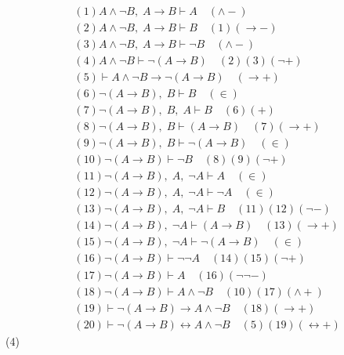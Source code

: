 \documentclass{article}
\begin{document}
\[
\begin{aligned}
&(1) A \wedge \neg B,\; A \to B \vdash A \quad (\wedge -) \\
&(2) A \wedge \neg B,\; A \to B \vdash B \quad (1)(\to -) \\
&(3) A \wedge \neg B,\; A \to B \vdash \neg B \quad (\wedge -) \\
&(4) A \wedge \neg B \vdash \neg (A \to B) \quad (2)(3)(\neg +) \\
&(5) \vdash A \wedge \neg B \to \neg (A \to B) \quad (\to +) \\
&(6) \neg (A \to B),\; B \vdash B \quad (\in) \\
&(7) \neg (A \to B),\; B, \; A \vdash B \quad (6)(+) \\
&(8) \neg (A \to B),\; B \vdash (A \to B) \quad (7)(\to +) \\
&(9) \neg (A \to B),\; B \vdash \neg (A \to B) \quad (\in) \\
&(10) \neg (A \to B) \vdash \neg B \quad (8)(9)(\neg +) \\  
&(11) \neg (A \to B),\; A,\; \neg A \vdash A \quad (\in) \\
&(12) \neg (A \to B),\; A,\; \neg A \vdash \neg A \quad (\in) \\
&(13) \neg (A \to B),\; A,\; \neg A \vdash B \quad (11)(12)(\neg -) \\
&(14) \neg (A \to B),\; \neg A \vdash (A \to B) \quad (13)(\to +) \\
&(15) \neg (A \to B),\; \neg A \vdash \neg (A \to B) \quad (\in) \\
&(16) \neg (A \to B) \vdash \neg \neg A \quad (14)(15)(\neg +) \\
&(17) \neg (A \to B) \vdash A \quad (16)(\neg \neg -) \\
&(18) \neg (A \to B) \vdash A \wedge \neg B \quad (10)(17)(\wedge +) \\
&(19) \vdash \neg (A \to B) \to A \wedge \neg B \quad (18)(\to +) \\
&(20) \vdash \neg (A \to B) \leftrightarrow A \wedge \neg B \quad (5)(19)(\leftrightarrow +)
\end{aligned}    
\]
(4)
\end{document}
